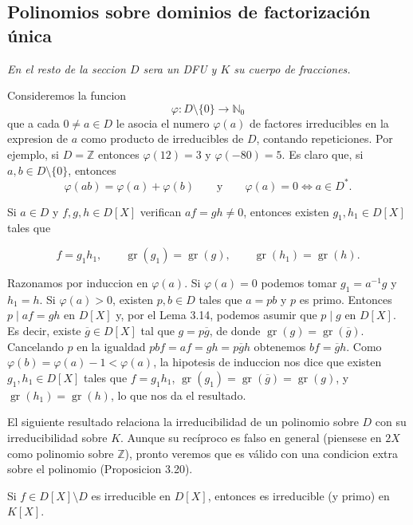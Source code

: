 \clearpage
\subsection{Polinomios sobre dominios de factorización única}

\emph{En el resto de la seccion $D$ sera un DFU y $K$ su cuerpo de fracciones.}

Consideremos la funcion
\[
\varphi:D\setminus\{0\}\to\mathbb{N}_{0}
\]
que a cada $0\neq a\in D$ le asocia el numero $\varphi(a)$ de factores irreducibles en la expresion de $a$ como producto de irreducibles de $D$, contando repeticiones. Por ejemplo, si $D=\mathbb{Z}$ entonces $\varphi(12)=3$ y $\varphi(-80)=5$. Es claro que, si $a,b\in D\setminus\{0\}$, entonces
\[
\varphi(ab)=\varphi(a)+\varphi(b)\qquad\text{y}\qquad\varphi(a)=0\Leftrightarrow a \in D^{*}.
\]

\begin{lemma}{}{}
Si $a\in D$ y $f,g,h\in D[X]$ verifican $af=gh\neq 0$, entonces existen $g_{1},h_{1}\in D[X]$ tales que

\[f=g_{1}h_{1},\qquad\operatorname{gr}(g_{1})=\operatorname{gr}(g),\qquad\operatorname{gr}(h _{1})=\operatorname{gr}(h).\]
\end{lemma}

\begin{proofbox}
Razonamos por induccion en $\varphi(a)$. Si $\varphi(a)=0$ podemos tomar $g_{1}=a^{-1}g$ y $h_{1}=h$. Si $\varphi(a)>0$, existen $p,b\in D$ tales que $a=pb$ y $p$ es primo. Entonces $p\mid af=gh$ en $D[X]$ y, por el Lema 3.14, podemos asumir que $p\mid g$ en $D[X]$. Es decir, existe $\overline{g}\in D[X]$ tal que $g=p\overline{g}$, de donde $\operatorname{gr}(g)=\operatorname{gr}(\overline{g})$. Cancelando $p$ en la igualdad $pbf=af=gh=p\overline{g}h$ obtenemos $bf=\overline{g}h$. Como $\varphi(b)=\varphi(a)-1<\varphi(a)$, la hipotesis de induccion nos dice que existen $g_{1},h_{1}\in D[X]$ tales que $f=g_{1}h_{1}$, $\operatorname{gr}(g_{1})=\operatorname{gr}(\overline{g})=\operatorname{gr}(g)$, y $\operatorname{gr}(h_{1})=\operatorname{gr}(h)$, lo que nos da el resultado.
\end{proofbox}

El siguiente resultado relaciona la irreducibilidad de un polinomio sobre $D$ con su irreducibilidad sobre $K$. Aunque su recíproco es falso en general (piensese en $2X$ como polinomio sobre $\mathbb{Z}$), pronto veremos que es válido con una condicion extra sobre el polinomio (Proposicion 3.20).

\begin{lemma}{}{}
Si $f\in D[X]\setminus D$ es irreducible en $D[X]$, entonces es irreducible (y primo) en $K[X]$.
\end{lemma}

